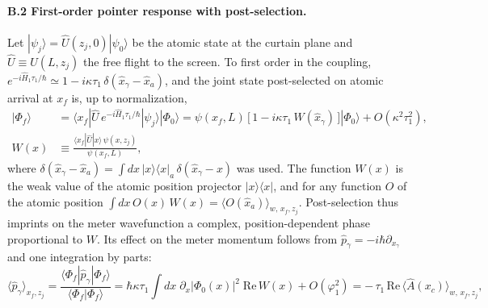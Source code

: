 \documentclass[11pt,a4paper]{article}
\newcommand{\bra}[1]{\langle #1 |}
\newcommand{\ket}[1]{| #1 \rangle}
\newcommand{\braket}[2]{\langle #1 | #2 \rangle}
\newcommand{\weakvalps}[2]{\langle #1 \rangle_{w,\,#2}}
\begin{document}
\paragraph{B.2 First-order pointer response with post-selection.} Let $\ket{\psi_j} = \hat{U}(z_j, 0)\ket{\psi_0}$ be the atomic state at the curtain plane and $\hat{U} \equiv \hat{U}(L, z_j)$ the free flight to the screen. To first order in the coupling, $e^{-i\hat{H}_1\tau_1/\hbar} \simeq 1 - i\kappa\tau_1\,\delta(\hat{x}_\gamma - \hat{x}_a)$, and the joint state post-selected on atomic arrival at $x_f$ is, up to normalization,
\begin{align}
\ket{\Phi_f} &= \bra{x_f}\hat{U}\,e^{-i\hat{H}_1\tau_1/\hbar}\ket{\psi_j}\ket{\Phi_0}
= \psi(x_f, L)\,\big[\,1 - i\kappa\tau_1\,W(\hat{x}_\gamma)\,\big]\ket{\Phi_0} + O(\kappa^2\tau_1^2), \nonumber\\
W(x) &\equiv \frac{\bra{x_f}\hat{U}\ket{x}\,\psi(x, z_j)}{\psi(x_f, L)},
\label{eq:B_meter_state}
\end{align}
where $\delta(\hat{x}_\gamma - \hat{x}_a) = \int dx\,\ket{x}\bra{x}_a\,\delta(\hat{x}_\gamma - x)$ was used. The function $W(x)$ is the weak value of the atomic position projector $\ket{x}\bra{x}$, and for any function $O$ of the atomic position $\int dx\,O(x)\,W(x) = \weakvalps{O(\hat{x}_a)}{x_f, z_j}$. Post-selection thus imprints on the meter wavefunction a complex, position-dependent phase proportional to $W$. Its effect on the meter momentum follows from $\hat{p}_\gamma = -i\hbar\partial_{x_\gamma}$ and one integration by parts:
\begin{equation}
\langle\hat{p}_\gamma\rangle_{x_f, z_j} = \frac{\bra{\Phi_f}\hat{p}_\gamma\ket{\Phi_f}}{\braket{\Phi_f}{\Phi_f}}
= \hbar\kappa\tau_1\!\int\! dx\;\partial_x|\Phi_0(x)|^2\;\mathrm{Re}\,W(x) + O(\varphi_1^2)
= -\,\tau_1\,\mathrm{Re}\,\weakvalps{\hat{A}(x_c)}{x_f, z_j},
\label{eq:B_pointer}
\end{equation}
\end{document}
